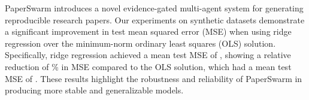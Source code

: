 PaperSwarm introduces a novel evidence-gated multi-agent system for generating reproducible research papers. Our experiments on synthetic datasets demonstrate a significant improvement in test mean squared error (MSE) when using ridge regression over the minimum-norm ordinary least squares (OLS) solution. Specifically, ridge regression achieved a mean test MSE of , showing a relative reduction of \% in MSE compared to the OLS solution, which had a mean test MSE of . These results highlight the robustness and reliability of PaperSwarm in producing more stable and generalizable models.
